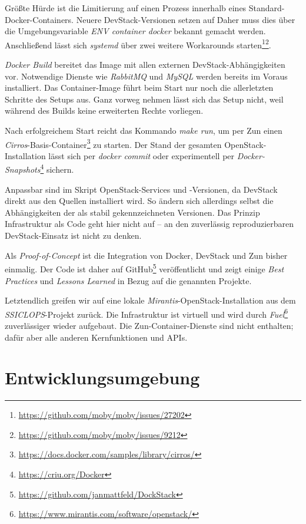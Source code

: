 
\noindent Größte Hürde ist die Limitierung auf einen Prozess innerhalb eines Standard-Docker-Containers. Neuere DevStack-Versionen setzen auf \. Daher muss dies über die Umgebungsvariable \emph{ENV container docker} bekannt gemacht werden. Anschließend lässt sich \emph{systemd} über zwei weitere Workarounds starten\footnote{\url{https://github.com/moby/moby/issues/27202}}\footnote{\url{https://github.com/moby/moby/issues/9212}}.

\emph{Docker Build} bereitet das Image mit allen externen DevStack-Abhängigkeiten vor. Notwendige Dienste wie \emph{RabbitMQ} und \emph{MySQL} werden bereits im Voraus installiert. Das Container-Image führt beim Start nur noch die allerletzten Schritte des Setups aus. Ganz vorweg nehmen lässt sich das Setup nicht, weil während des Builds keine erweiterten Rechte vorliegen.

Nach erfolgreichem Start reicht das Kommando \emph{make run}, um per Zun einen \emph{Cirros}-Basis-Container\footnote{\url{https://docs.docker.com/samples/library/cirros/}} zu starten. Der Stand der gesamten OpenStack-Installation lässt sich per \emph{docker commit} oder experimentell per \emph{Docker-Snapshots}\footnote{\url{https://criu.org/Docker}} sichern.

Anpassbar sind im Skript OpenStack-Services und -Versionen, da DevStack direkt aus den Quellen installiert wird. So ändern sich allerdings selbst die Abhängigkeiten der als stabil gekennzeichneten Versionen. Das Prinzip Infrastruktur als Code geht hier nicht auf -- an den zuverlässig reproduzierbaren DevStack-Einsatz ist nicht zu denken. 

Als \emph{Proof-of-Concept} ist die Integration von Docker, DevStack und Zun bisher einmalig. Der Code ist daher auf GitHub\footnote{\url{https://github.com/janmattfeld/DockStack}} veröffentlicht und zeigt einige \emph{Best Practices} und \emph{Lessons Learned} in Bezug auf die genannten Projekte.

Letztendlich greifen wir auf eine lokale \emph{Mirantis}-OpenStack-Installation aus dem \emph{SSICLOPS}-Projekt zurück. Die Infrastruktur ist virtuell und wird durch \emph{Fuel}\footnote{\url{https://www.mirantis.com/software/openstack/}} zuverlässiger wieder aufgebaut. Die Zun-Container-Dienste sind nicht enthalten; dafür aber alle anderen Kernfunktionen und APIs.

\section{Entwicklungsumgebung}

